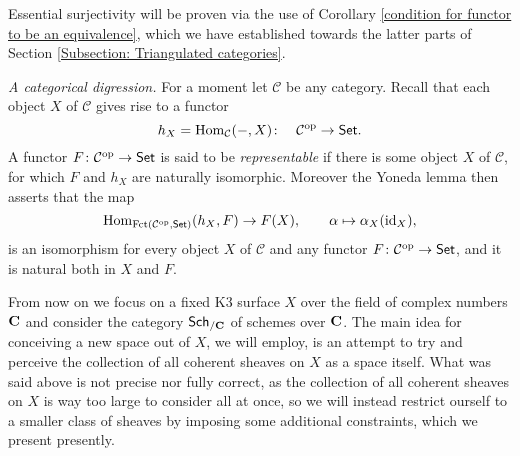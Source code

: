 Essential surjectivity will be proven via the use of Corollary \ref{condition for functor to be an equivalence}, which we have established towards the latter parts of Section \ref{Subsection: Triangulated categories}.



\noindent
\textsl{A categorical digression.}
For a moment let $\mathcal C$ be any category. Recall that each object $X$ of $\mathcal C$ gives rise to a functor 
\[
    h_X = \mathrm{Hom}_{\mathcal C}(-, X) \colon  \quad \mathcal C^{\text{op}} \to \mathsf{Set}.
\]
A functor $F \colon \mathcal C^{\text{op}} \to \mathsf{Set}$ is said to be \emph{representable} if there is some object $X$ of $\mathcal C$, for which $F$ and $h_X$ are naturally isomorphic. Moreover the Yoneda lemma then asserts that the map  
\begin{equation}
    \label{eq: nat iso of Yoneda}
    \mathrm{Hom}_{\operatorname{Fct(\mathcal C^{\text{op}}, \mathsf{Set})}}(h_X, F) \to F(X), \qquad \alpha \mapsto \alpha_X(\operatorname{id}_{X}),
\end{equation}
is an isomorphism for every object $X$ of $\mathcal C$ and any functor $F \colon \mathcal C ^{\text{op}} \to \mathsf{Set}$, and it is natural both in $X$ and $F$.

\noindent
From now on we focus on a fixed K3 surface $X$ over the field of complex numbers $\mathbf C$ and consider the category $\mathsf{Sch}_{/\mathbf C}$ 
of schemes over $\mathbf C$. The main idea for conceiving a new space out of $X$, we will employ, is an attempt to try and perceive the collection of all coherent sheaves on $X$ as a space itself. What was said above is not precise nor fully correct, as the collection of all coherent sheaves on $X$ is way too large to consider all at once, so we will instead restrict ourself to a smaller class of sheaves by imposing some additional constraints, which we present presently. 

